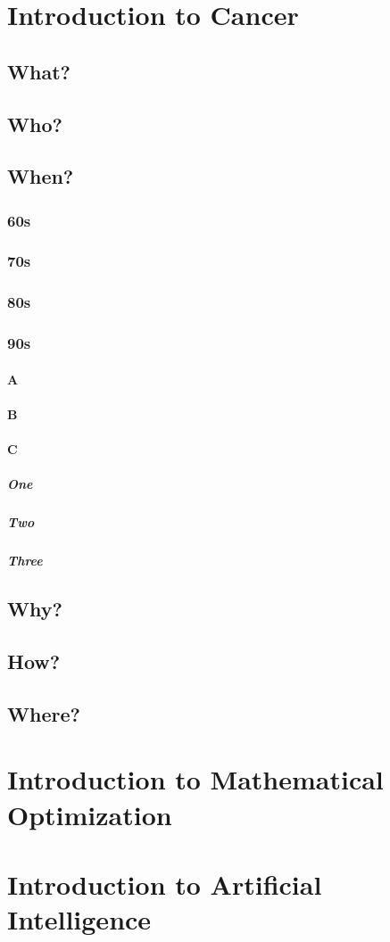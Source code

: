 \section{Introduction to Cancer}
\lipsum[1]
\subsection{What?}
\lipsum[2]
\subsection{Who?}
\lipsum[3]
\subsection{When?}
\subsubsection{60s}
\subsubsection{70s}
\subsubsection{80s}
\subsubsection{90s}
\paragraph{A}
\paragraph{B}
\paragraph{C}
\subparagraph{One}
\subparagraph{Two}
\subparagraph{Three}
\lipsum[4]
\subsection{Why?}
\lipsum[5]
\subsection{How?}
\lipsum[6]
\subsection{Where?}
\lipsum[7]

\section{Introduction to Mathematical Optimization}

\lipsum[8-12]

\section{Introduction to Artificial Intelligence}

\lipsum[13-18]